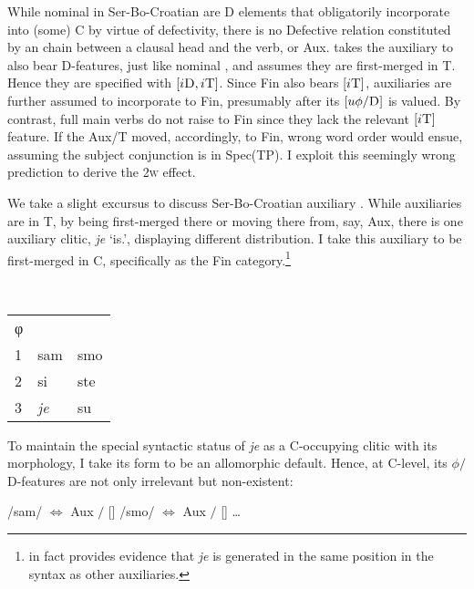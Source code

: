 \documentclass[output=paper]{langsci/langscibook}
\begin{document}
While nominal  in Ser-Bo-Croatian are
D elements that obligatorily incorporate into (some)
C by virtue of defectivity, there is no Defective relation
constituted by an  chain between a clausal head and the verb, or Aux.
\citet[391]{roberts:2012uq} takes the auxiliary  to also bear
D-features, just like nominal , and assumes they are first-merged in
T. Hence they are specified with
$[i\textsc{D},i\textsc{T}]$. Since Fin also bears $[i\textsc{T}]$, auxiliaries
are further assumed to incorporate to Fin, presumably
after its $[u\phi/\textsc{D}]$ is valued. By contrast, full main verbs do not
raise to Fin since they lack the relevant $[i\textsc{T}]$ feature. If the Aux/T
moved, accordingly, to Fin, wrong word order would ensue, assuming the subject
conjunction is in Spec(TP). I exploit this seemingly wrong prediction
to derive the \textsc{2w} effect.

We take a slight excursus to discuss Ser-Bo-Croatian
auxiliary . While auxiliaries are in T, by being
first-merged there \citet{roberts:2012uq} or moving there from, say,
Aux, there is one auxiliary clitic, \emph{je}
`is.\Tsg{}', displaying different distribution. I take this auxiliary to
be first-merged in C, specifically as the Fin
category.\footnote{\citet{Boskovic:2004c} in fact provides evidence that
\emph{je} is generated in the same position in the syntax as other
auxiliaries.}

\begin{exe}
    \ex \leavevmode\\[-1\baselineskip]\begin{tabular}{lll}
	φ	& \Sg{} 	& \Pl{}\\
	1	&		sam			& smo \\
	2	&		si			& ste \\
	3	&		\emph{je}			& su
	\end{tabular}
\end{exe}

To maintain the special syntactic status of \emph{je} as a C-occupying clitic
with its morphology, I take its form to be an allomorphic default. Hence, at
C-level, its $\phi/$D-features are not only irrelevant but
non-existent:\largerpage[1]

\begin{exe}
\ex
\begin{xlista}
\ex {}
\ex /sam/ $\Leftrightarrow$ Aux $\big/$ [\Fsg{}]
\ex /smo/ $\Leftrightarrow$ Aux $\big/$ [\Fpl{}]
\ex \ldots
\end{xlista}
\end{exe}
\end{document}
